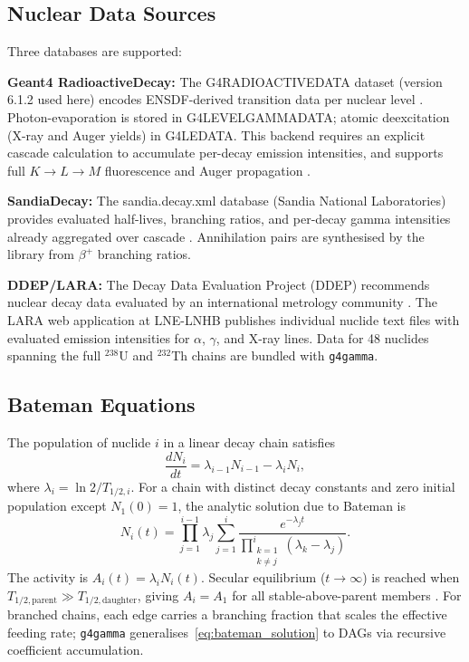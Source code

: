 \documentclass[journal]{IEEEtran}
\begin{document}
\subsection{Nuclear Data Sources}

Three databases are supported:

\textbf{Geant4 RadioactiveDecay:} The G4RADIOACTIVEDATA dataset (version 6.1.2
used here) encodes ENSDF-derived transition data per nuclear level
\cite{ENSDF1992}.
Photon-evaporation is stored in G4LEVELGAMMADATA; atomic deexcitation (X-ray and
Auger yields) in G4LEDATA.
This backend requires an explicit cascade calculation to accumulate per-decay
emission intensities, and supports full $K\to L\to M$ fluorescence and Auger
propagation \cite{Hauf2013rdm}.

\textbf{SandiaDecay:} The sandia.decay.xml database (Sandia National
Laboratories) provides evaluated half-lives, branching ratios, and per-decay
gamma intensities already aggregated over cascade \cite{SandiaDecay}.
Annihilation pairs are synthesised by the library from $\beta^+$ branching ratios.

\textbf{DDEP/LARA:} The Decay Data Evaluation Project (DDEP) recommends
nuclear decay data evaluated by an international metrology community \cite{Kellett2017}.
The LARA web application at LNE-LNHB \cite{Dulieu2017} publishes individual
nuclide text files with evaluated emission intensities for $\alpha$, $\gamma$,
and X-ray lines.
Data for 48 nuclides spanning the full $^{238}$U and $^{232}$Th chains are
bundled with \texttt{g4gamma}.

\subsection{Bateman Equations}

The population of nuclide $i$ in a linear decay chain satisfies
\begin{equation}
  \frac{dN_i}{dt} = \lambda_{i-1} N_{i-1} - \lambda_i N_i,
  \label{eq:bateman_ode}
\end{equation}
where $\lambda_i = \ln 2 / T_{1/2,i}$.
For a chain with distinct decay constants and zero initial population except
$N_1(0) = 1$, the analytic solution due to Bateman \cite{Bateman1910} is
\begin{equation}
  N_i(t) = \prod_{j=1}^{i-1}\lambda_j
            \sum_{j=1}^{i}
            \frac{e^{-\lambda_j t}}
            {\displaystyle\prod_{\substack{k=1\\k\neq j}}^{i}(\lambda_k-\lambda_j)}.
  \label{eq:bateman_solution}
\end{equation}
The activity is $A_i(t) = \lambda_i N_i(t)$.
Secular equilibrium ($t\to\infty$) is reached when $T_{1/2,\text{parent}} \gg
T_{1/2,\text{daughter}}$, giving $A_i = A_1$ for all stable-above-parent
members \cite{Bateman1910}.
For branched chains, each edge carries a branching fraction that scales the
effective feeding rate; \texttt{g4gamma} generalises~\eqref{eq:bateman_solution}
to DAGs via recursive coefficient accumulation.
\end{document}
